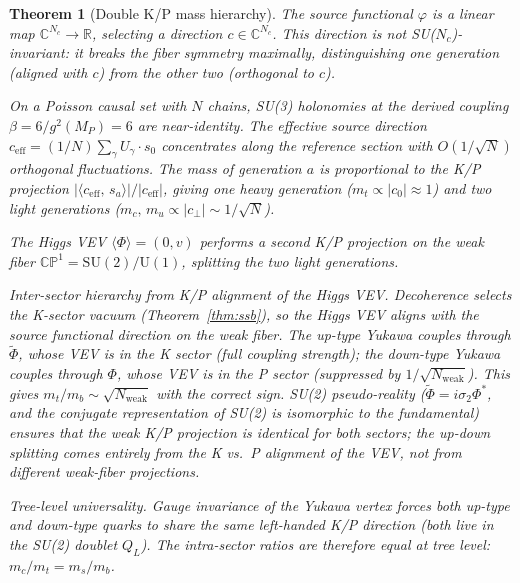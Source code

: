 \documentclass[12pt,a4paper]{article}
\newtheorem{theorem}{Theorem}
\begin{document}
\begin{theorem}[Double K/P mass hierarchy]
\label{thm:kp_mass}
The source functional $\varphi$ is a linear map $\mathbb{C}^{N_c} \to \mathbb{R}$, selecting a direction $c \in \mathbb{C}^{N_c}$. This direction is \emph{not} SU($N_c$)-invariant: it breaks the fiber symmetry maximally, distinguishing one generation (aligned with $c$) from the other two (orthogonal to $c$).

On a Poisson causal set with $N$ chains, SU(3) holonomies at the derived coupling $\beta = 6/g^2(M_P) = 6$ are near-identity. The effective source direction $c_{\mathrm{eff}} = (1/N)\sum_\gamma U_\gamma \cdot s_0$ concentrates along the reference section with $O(1/\sqrt{N})$ orthogonal fluctuations. The mass of generation $a$ is proportional to the K/P projection $|\langle c_{\mathrm{eff}},\, s_a \rangle|/|c_{\mathrm{eff}}|$, giving one heavy generation ($m_t \propto |c_0| \approx 1$) and two light generations ($m_c,\, m_u \propto |c_\perp| \sim 1/\sqrt{N}$).

The Higgs VEV $\langle\Phi\rangle = (0, v)$ performs a second K/P projection on the weak fiber $\mathbb{CP}^1 = \mathrm{SU}(2)/\mathrm{U}(1)$, splitting the two light generations.

\emph{Inter-sector hierarchy from K/P alignment of the Higgs VEV.}  Decoherence selects the K-sector vacuum (Theorem~\ref{thm:ssb}), so the Higgs VEV aligns with the source functional direction on the weak fiber.  The up-type Yukawa couples through $\tilde{\Phi}$, whose VEV is in the K sector (full coupling strength); the down-type Yukawa couples through $\Phi$, whose VEV is in the P sector (suppressed by $1/\sqrt{N_{\mathrm{weak}}}$).  This gives $m_t/m_b \sim \sqrt{N_{\mathrm{weak}}}$ with the correct sign.  SU(2) pseudo-reality ($\tilde{\Phi} = i\sigma_2 \Phi^*$, and the conjugate representation of SU(2) is isomorphic to the fundamental) ensures that the weak K/P projection is identical for both sectors; the up-down splitting comes entirely from the K vs.\ P alignment of the VEV, not from different weak-fiber projections.

\emph{Tree-level universality.}  Gauge invariance of the Yukawa vertex forces both up-type and down-type quarks to share the same left-handed K/P direction (both live in the SU(2) doublet $Q_L$).  The intra-sector ratios are therefore equal at tree level: $m_c/m_t = m_s/m_b$.


\end{theorem}
\end{document}
